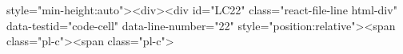 style="min-height:auto"><div><div id="LC22" class="react-file-line html-div" data-testid="code-cell" data-line-number="22" style="position:relative"><span class="pl-c"><span class="pl-c">%